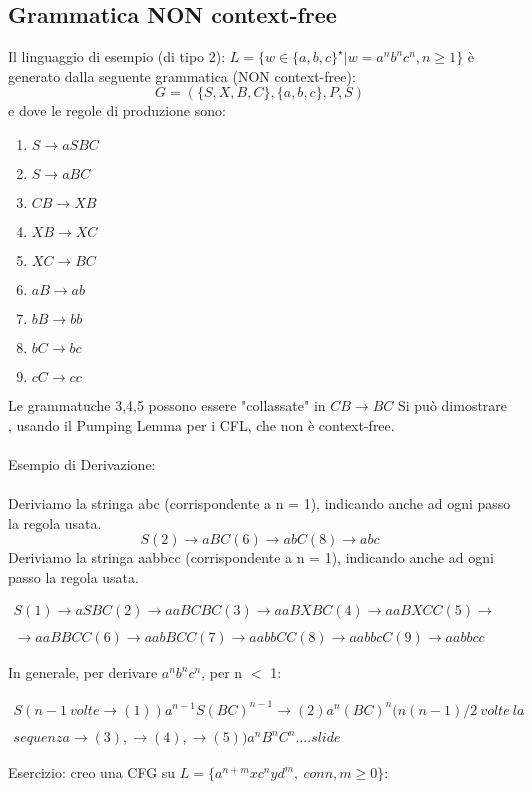\documentclass[11pt]{article}
\begin{document}
\subsection{Grammatica NON context-free}
Il linguaggio di esempio (di tipo 2): $L = \{w \in \{a,b,c\}^{\star} | w = a^nb^nc^n, n\geq 1\}$
è generato dalla seguente grammatica (NON context-free): $$ G=(\{S,X,B,C\}, \{a,b,c\}, P, S)$$
e dove le regole di produzione sono:
\begin{enumerate}
	\item $S \rightarrow aSBC$
	\item $S \rightarrow aBC$
	\item $CB \rightarrow XB$
	\item $XB \rightarrow XC$
	\item $XC \rightarrow BC$
	\item $aB \rightarrow ab$
	\item $bB \rightarrow bb$
	\item $bC \rightarrow bc$
	\item $cC \rightarrow cc$
\end{enumerate}
Le grammatuche 3,4,5 possono essere "collassate" in $CB \rightarrow BC$
Si può dimostrare , usando il Pumping Lemma per i CFL, che non è context-free.
\\ \\
Esempio di Derivazione:
\\ \\
Deriviamo la stringa abc (corrispondente a n = 1), indicando anche ad ogni passo la regola usata.
$$ S (2)\rightarrow aBC (6)\rightarrow abC (8)\rightarrow abc$$
Deriviamo la stringa aabbcc (corrispondente a n = 1), indicando anche ad ogni passo la regola usata.

\begin{equation*}\label{stigeiz}\begin{split}
S (1)\rightarrow aSBC (2)\rightarrow aaBCBC (3)\rightarrow aaBXBC (4) \rightarrow aaBXCC (5) \rightarrow \\&\\ \rightarrow aaBBCC (6)\rightarrow aabBCC (7)\rightarrow aabbCC (8)\rightarrow aabbcC (9)\rightarrow aabbcc
\end{split}
\end{equation*}

In generale, per derivare $a^nb^nc^n$, per n $<$ 1:

\begin{equation*}
\begin{split}
S(n-1 \medspace volte \rightarrow (1)) a^{n-1}S(BC)^{n-1}\rightarrow (2) a^n(BC)^n(n(n-1)/2 \medspace volte \medspace la \\&\\ sequenza \rightarrow (3), \rightarrow (4), \rightarrow (5))a^nB^nC^n....slide
\end{split}
\end{equation*}

Esercizio: creo una CFG su $L = \{a^{n+m}xc^nyd^m, \medspace con n,m \geq 0\}$:
\end{document}
